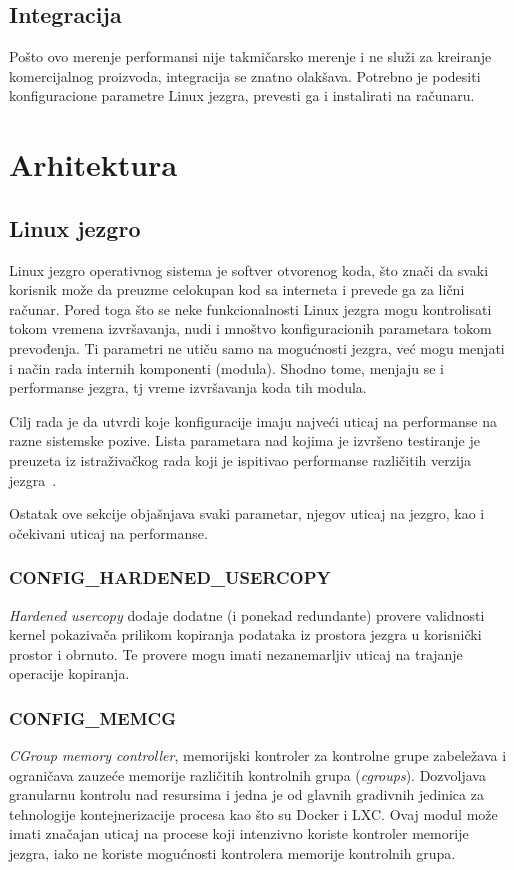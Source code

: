 \documentclass[12pt]{report}
\begin{document}
\section{Integracija}
Pošto ovo merenje performansi nije takmičarsko merenje i ne služi za kreiranje komercijalnog proizvoda, integracija se znatno olakšava. Potrebno je podesiti konfiguracione parametre Linux jezgra, prevesti ga i instalirati na računaru.

\chapter{Arhitektura}
\section{Linux jezgro}
Linux jezgro operativnog sistema je softver otvorenog koda, što znači da svaki korisnik može da preuzme celokupan kod sa interneta i prevede ga za lični računar. Pored toga što se neke funkcionalnosti Linux jezgra mogu kontrolisati tokom vremena izvršavanja, nudi i mnoštvo konfiguracionih parametara tokom prevođenja. Ti parametri ne utiču samo na mogućnosti jezgra, već mogu menjati i način rada internih komponenti (modula). Shodno tome, menjaju se i performanse jezgra, tj vreme izvršavanja koda tih modula.

Cilj rada je da utvrdi koje konfiguracije imaju najveći uticaj na performanse na razne sistemske pozive. Lista parametara nad kojima je izvršeno testiranje je preuzeta iz istraživačkog rada koji je ispitivao performanse različitih verzija jezgra~\cite{paper}.

Ostatak ove sekcije objašnjava svaki parametar, njegov uticaj na jezgro, kao i očekivani uticaj na performanse.

\subsection{CONFIG\_HARDENED\_USERCOPY}
\textit{Hardened usercopy} dodaje dodatne (i ponekad redundante) provere validnosti kernel pokazivača prilikom kopiranja podataka iz prostora jezgra u korisnički prostor i obrnuto. Te provere mogu imati nezanemarljiv uticaj na trajanje operacije kopiranja.

\subsection{CONFIG\_MEMCG}
\textit{CGroup memory controller}, memorijski kontroler za kontrolne grupe zabeležava i ograničava zauzeće memorije različitih kontrolnih grupa (\textit{cgroups}). Dozvoljava granularnu kontrolu nad resursima i jedna je od glavnih gradivnih jedinica za tehnologije kontejnerizacije procesa kao što su Docker i LXC\@. Ovaj modul može imati značajan uticaj na procese koji intenzivno koriste kontroler memorije jezgra, iako ne koriste mogućnosti kontrolera memorije kontrolnih grupa.
\end{document}
